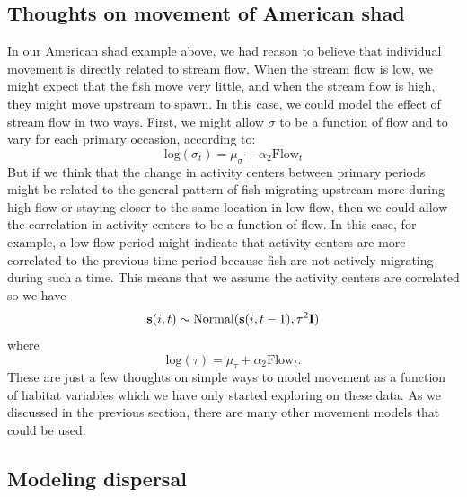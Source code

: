 \subsection{Thoughts on movement of American shad}

In our American shad example above, we had reason to believe that
individual movement is directly related to stream flow.  When the
stream flow is low, we might expect that the fish move very little,
and when the stream flow is high, they might move upstream to
spawn. In this case, we could model the effect of stream flow in two
ways.  First, we might allow $\sigma$ to be a function of flow and to
vary for each primary occasion, according to:
\[
 \mbox{log}(\sigma_t) = \mu_{\sigma} + \alpha_2 \mbox{Flow}_t
\]
But if we think that the change in activity centers between primary
periods might be related to the general pattern of fish migrating
upstream more during high flow or staying closer to the same location
in low flow, then we could allow the correlation in activity centers
to be a function of flow.  In this case, for example, a low flow
period might indicate that activity centers are more correlated to the
previous time period because fish are not actively migrating during
such a time.  This means that we assume the activity centers are
correlated so we have
\[
{\bf s}(i,t) \sim \mbox{Normal}({\bf
  s}(i,t-1), \tau^{2} {\bf I})
\]
where
\[
\mbox{log}(\tau) = \mu_{\tau} + \alpha_2 \mbox{Flow}_t.
\]
These are just a few thoughts on simple ways to model movement as a
function of habitat variables which we have only started exploring on
these data.  As we discussed in the previous section, there are many
other movement models that could be used.

\subsection{Modeling  dispersal}

